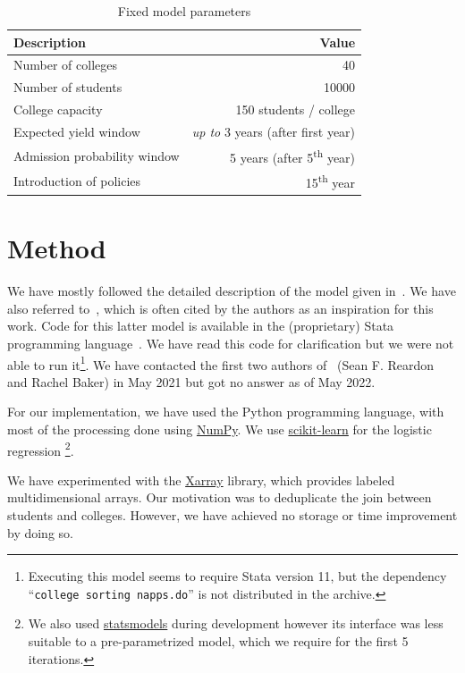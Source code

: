\begin{table}[!ht]
    \centering
    \begin{tabular}{l r} \toprule
        \textbf{Description} & \textbf{Value} \\ \midrule
        Number of colleges & 40 \\
        Number of students & 10000 \\

        College capacity & 150 students / college \\
        Expected yield window & \emph{up to} 3 years (after first year) \\
        Admission probability window & 5 years (after 5\textsuperscript{th} year) \\
        Introduction of policies & 15\textsuperscript{th} year \\ \bottomrule
    \end{tabular}
    \caption{Fixed model parameters}
    \label{tab:const}
\end{table}


\section{Method}

We have mostly followed the detailed description of the model given in~\cite[Appendix~C]{reardon2018levels}.
We have also referred to~\cite{reardon2016agent}, which is often cited by the authors as an inspiration for this work.
Code for this latter model is available in the (proprietary) Stata programming language~\cite{reardon2016stata}.
We have read this code for clarification but we were not able to run it\footnote{Executing this model seems to require Stata version 11, but the dependency ``\texttt{college sorting napps.do}'' is not distributed in the archive.}.
We have contacted the first two authors of~\cite{reardon2018levels} (Sean F. Reardon and Rachel Baker) in May 2021 but got no answer as of May 2022.

For our implementation, we have used the Python programming language, with most of the processing done using \href{https://numpy.org/}{NumPy}.
We use \href{https://scikit-learn.org/}{scikit-learn} for the logistic regression%
\footnote{We also used \href{https://www.statsmodels.org/}{statsmodels} during development however its interface was less suitable to a pre-parametrized model, which we require for the first 5 iterations.}.

We have experimented with the \href{https://xarray.dev/}{Xarray} library, which provides labeled multidimensional arrays.
Our motivation was to deduplicate the join between students and colleges.
However, we have achieved no storage or time improvement by doing so.

